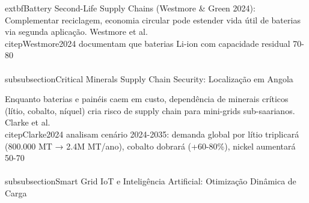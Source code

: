 \documentclass[12pt, a4paper]{article}
\begin{document}
{{{{{{{{{{{	extbf{Battery Second-Life Supply Chains (Westmore & Green 2024)}: Complementar reciclagem, economia circular pode estender vida útil de baterias via segunda aplicação. Westmore et al.~\\citep{Westmore2024} documentam que baterias Li-ion com capacidade residual 70-80\\%

\\subsubsection{Critical Minerals Supply Chain Security: Localização em Angola}

Enquanto baterias e painéis caem em custo, dependência de minerais críticos (lítio, cobalto, níquel) cria risco de supply chain para mini-grids sub-saarianos. Clarke et al.~\\citep{Clarke2024} analisam cenário 2024-2035: demanda global por lítio triplicará (800.000 MT → 2.4M MT/ano), cobalto dobrará (+60-80\%), nickel aumentará 50-70\\%

\\subsubsection{Smart Grid IoT e Inteligência Artificial: Otimização Dinâmica de Carga}

}}}}}}}}}}}
\end{document}
